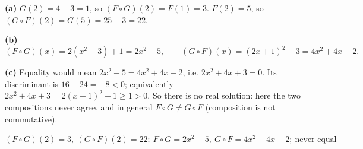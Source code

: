 \textbf{(a)} $G(2)=4-3=1$, so $(F\circ G)(2)=F(1)=3$. $F(2)=5$, so $(G\circ F)(2)=G(5)=25-3=22$.

\textbf{(b)}
\[(F\circ G)(x)=2\left(x^2-3\right)+1=2x^2-5,\qquad(G\circ F)(x)=(2x+1)^2-3=4x^2+4x-2.\]

\textbf{(c)} Equality would mean $2x^2-5=4x^2+4x-2$, i.e. $2x^2+4x+3=0$. Its discriminant is $16-24=-8<0$; equivalently $2x^2+4x+3=2(x+1)^2+1\ge1>0$. So there is no real solution: here the two compositions never agree, and in general $F\circ G\ne G\circ F$ (composition is not commutative).

$\boxed{(F\circ G)(2)=3,\ (G\circ F)(2)=22;\ F\circ G=2x^2-5,\ G\circ F=4x^2+4x-2;\ \text{never equal}}$
